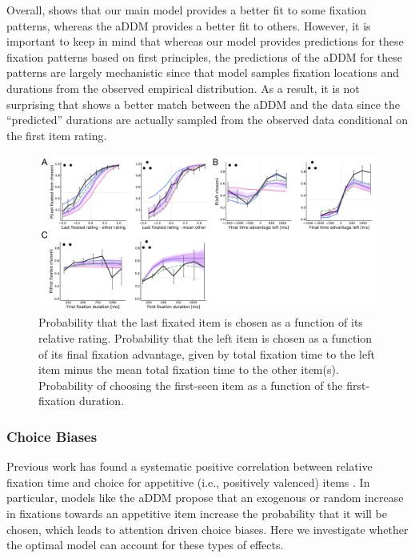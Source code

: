 Overall,  shows that our main model provides a better fit to some fixation patterns, whereas the aDDM provides a better fit to others. However, it is important to keep in mind that whereas our model provides predictions for these fixation patterns based on first principles, the predictions of the aDDM for these patterns are largely mechanistic since that model samples fixation locations and durations from the observed empirical distribution. As a result, it is not surprising that  shows a better match between the aDDM and the data since the ``predicted'' durations are actually sampled from the observed data conditional on the first item rating.


\begin{figure}[t!]
  \centering
  \includegraphics[width=\textwidth]{figs/attention/Fig7.pdf}
  \caption{
   Probability that the last fixated item is chosen as a function of its relative rating.
   Probability that the left item is chosen as a function of its final fixation advantage, given by total fixation time to the left item minus the mean total fixation time to the other item(s).
   Probability of choosing the first-seen item as a function of the first-fixation duration.
  }
  \label{fig:attention7}
\end{figure}

\subsubsection{Choice Biases}

Previous work has found a systematic positive correlation between relative fixation time and choice for appetitive (i.e., positively valenced) items \citep{shimojo2003gaze,armel2008neuroeconomic,armel2008biasing,krajbich2010visual,krajbich2011multialternative, gluth2020valuebased}. In particular, models like the aDDM propose that an exogenous or random increase in fixations towards an appetitive item increase the probability that it will be chosen, which leads to attention driven choice biases.  Here we investigate whether the optimal model can account for these types of effects.


